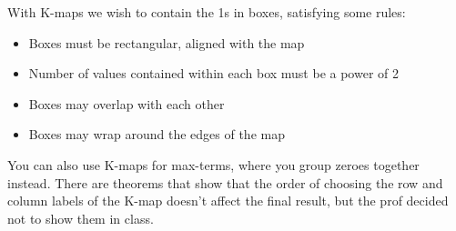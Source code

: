 \noindent With K-maps we wish to contain the 1s in boxes, satisfying some rules:
\begin{itemize}
\item Boxes must be rectangular, aligned with the map
\item Number of values contained within each box must be a power of 2
\item Boxes may overlap with each other
\item Boxes may wrap around the edges of the map
\end{itemize}

You can also use K-maps for max-terms, where you group zeroes together instead. There are theorems that show that the order of choosing the row and column labels of the K-map doesn't affect the final result, but the prof decided not to show them in class.
